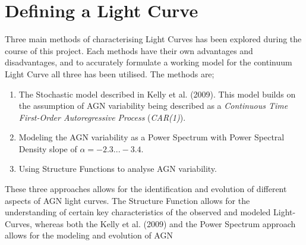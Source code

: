 \documentclass[a4paper, 12pt, twoside]{article}
\begin{document}
\section{Defining a Light Curve}
Three main methods of characterising Light Curves has been explored during the course of this project. Each methods have their own advantages and disadvantages, and to accurately formulate a working model for the continuum Light Curve all three has been utilised. The methods are;
\begin{enumerate}
\item The Stochastic model described in Kelly et al. (2009). This model builds on the assumption of AGN variability being described as a \emph{Continuous Time First-Order Autoregressive Process} (\emph{CAR(1)}).
\item Modeling the AGN variability as a Power Spectrum with Power Spectral Density slope of $\alpha=-2.3...-3.4$.
\item Using Structure Functions to analyse AGN variability.
\end{enumerate}
These three approaches allows for the identification and evolution of different aspects of AGN light curves. The Structure Function allows for the understanding of certain key characteristics of the observed and modeled Light-Curves, whereas both the Kelly et al. (2009) and the Power Spectrum approach allows for the modeling and evolution of AGN 
\end{document}
